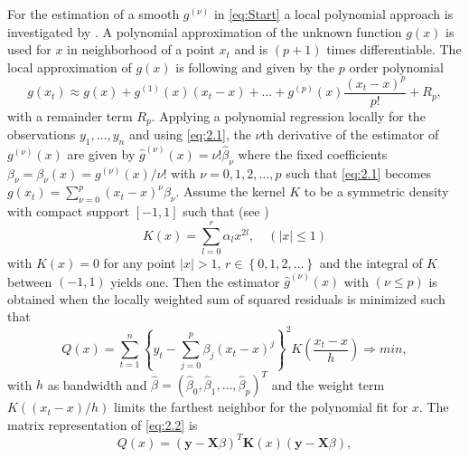 \documentclass[12pt]{article}
\begin{document}
%
%
For the estimation of a smooth \(g^{(\nu)}\) in \eqref{eq:Start} a local polynomial approach is investigated by \textcite{ruppert1994multivariate,wand1994kernel,fan1995data,beran2002local}.
A polynomial approximation of the unknown function \(g(x)\) is used for \(x\) in neighborhood of a point \(x_{t}\)
and is \((p+1)\) times differentiable. 
The local approximation of \(g(x)\) is following \textcite{beran2016long} and \textcite{beran2002local} given by the \(p\) order polynomial
\begin{equation}
\label{lp}
g(x_{t}) \approx g(x) + g^{(1)}(x)(x_{t} - x) + \ldots + g^{(p)}(x)\frac{(x_{t} - x)^{p}}{p!} + R_{p},
\end{equation}
with a remainder term \(R_{p}\). 
Applying a polynomial regression locally for the observations \(y_{1},\ldots,y_{n}\) and using \eqref{eq:2.1}, 
the \(\nu\)th derivative of the estimator of \(g^{(\nu)}(x)\) are given by
\(\hat{g}^{(\nu)}(x)= \nu! \hat{\beta}_{\nu}\) 
where the fixed coefficients \(\beta_{\nu} = \beta_{\nu}(x) = g^{(\nu)}(x) / \nu!\) 
with \(\nu = 0,1,2,\ldots,p\) 
such that \eqref{eq:2.1} becomes
\(g(x_{t}) = \sum_{\nu=0}^{p}(x_{t} - x)^{\nu} \beta_{\nu} \).
Assume the kernel \(K\) to be a symmetric density with compact support \([-1,1] \) such that (see \textcite{gasser1984estimating})
\begin{equation}
\label{eq:Kernelfunction}
K(x) = \sum_{l=0}^{r}\alpha_l x^{2l}, \quad (|x| \leq 1)   %
\end{equation}
with \(K(x) = 0\) for any point \(|x| > 1\), \(r \in \left\lbrace0,1,2,\ldots \right\rbrace \) and the integral of \(K\) between \((-1,1)\) yields one. 
Then the estimator \(\hat{g}^{(\nu)}(x)\) with \((\nu \leq p)\) is obtained when the locally weighted sum of squared residuals is minimized such that
\begin{equation}
\label{eq:2.2}
Q(x) = \sum_{t=1}^{n} \left\lbrace y_{t} - \sum_{j=0}^{p} \beta_{j}(x_{t} - x)^{j} \right\rbrace^{2} K \left( \frac{x_{t} - x}{h} \right) \Rightarrow min ,
\end{equation}
with \(h\) as bandwidth and \(\hat{\beta} = (\hat{\beta}_{0},\hat{\beta}_{1},\ldots,\hat{\beta}_{p})^{T}\) and
the weight term \(K((x_{t} - x)/h)\) limits the farthest neighbor for the polynomial fit for \(x\).
The matrix representation of \eqref{eq:2.2} is 
\begin{equation}
\label{eq:2.3}
Q(x) = (\mathbf{y} - \mathbf{X}\beta)^{T} \mathbf{K}(x) (\mathbf{y} - \mathbf{X}\beta)  ,
\end{equation} 
\end{document}
